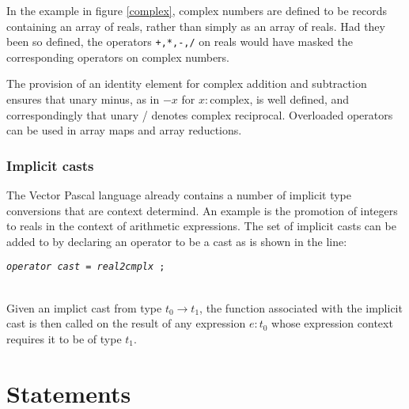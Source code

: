 {In the example in figure \ref{complex}, complex numbers are defined to be records
containing an array of reals, rather than simply as an array of reals. Had they
been so defined, the operators \texttt{+,{*},-,/} on reals would have masked
the corresponding operators on complex numbers. 

The provision of an identity element for complex addition and subtraction ensures
that unary minus, as in $ -x $ for $ x: $complex, is well defined, and
correspondingly that unary / denotes complex reciprocal. Overloaded operators
can be used in array maps and array reductions. 

\subsubsection{Implicit casts}
The Vector Pascal language already contains a number of implicit type
conversions that are context determind. An example is the promotion of
integers to reals in the context of arithmetic expressions. The set of
implicit casts can be added to by declaring an operator to be a cast
as is shown in the line:

\parbox{14cm}{\texttt{\textit{operator} 	\textit{cast} 	=	\textit{real2cmplx}  ;}}\\

Given an implict cast from type $t_0\rightarrow t_1$,
the function associated with the implicit cast is then called 
on the result
of any expression $e:t_0 $ whose expression context requires 
it to be of type $t_1$.
\section{Statements}

}

